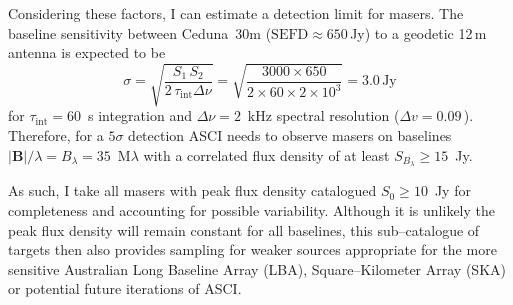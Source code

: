    Considering these factors, I can estimate a detection limit for masers. The baseline sensitivity between Ceduna~30m ($\text{SEFD}\approx650$\,Jy) to a geodetic 12\,m antenna is expected to be
    \begin{equation}
        \sigma=\sqrt{\frac{S_1\,S_2}{2\,\tau_\text{int}\Delta\nu}}=\sqrt{\frac{3000\times 650}{2\times60\times2\times 10^3}}= 3.0\,\text{Jy}
    \end{equation}  
    for $\tau_\text{int}=60$~s integration and $\Delta\nu=2$~kHz spectral resolution ($\Delta v = 0.09$\,\kms). Therefore, for a $5\sigma$ detection ASCI needs to observe masers on baselines $|\textbf{B}|/\lambda=B_\lambda=35$~M$\lambda$ with a correlated flux density of at least $S_{B_\lambda}\ge 15$~Jy. 
    
    As such, I take all masers with peak flux density catalogued $S_0\ge10$~Jy for completeness and accounting for possible variability. Although it is unlikely the peak flux density will remain constant for all baselines, this sub--catalogue of targets then also provides sampling for weaker sources appropriate for the more sensitive Australian Long Baseline Array (LBA), Square--Kilometer Array (SKA) or potential future iterations of ASCI.
    
